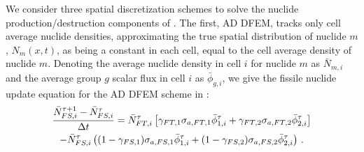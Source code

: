 We consider three spatial discretization schemes to solve the nuclide production/destruction components of .  
The first, AD DFEM, tracks only cell average nuclide densities, approximating the true spatial distribution of nuclide $m$, $N_m(x,t)$, as being a constant in each cell, equal to the cell average density of nuclide $m$.  
Denoting the average nuclide density in cell $i$ for nuclide $m$ as $\bar{N}_{m,i}$ and the average group $g$ scalar flux in cell $i$ as $\bar{\phi}_{g,i}$, we give the fissile nuclide update equation for the AD DFEM scheme in :
\begin{multline}
\frac{\bar{N}_{FS,i}^{\tau+1} - \bar{N}^{\tau}_{FS,i}}{\Delta t} = \bar{N}^{\tau}_{FT,i}\left[\gamma_{FT,1}\sigma_{a,FT,1} \bar{\phi}^{\tau}_{1,i} + \gamma_{FT,2}\sigma_{a,FT,2}\bar{\phi}^{\tau}_{2,i}  \right] \\
-\bar{N}^{\tau}_{FS,i}\left((1-\gamma_{FS,1})\sigma_{a,FS,1}\bar{\phi}^{\tau}_{1,i} + (1-\gamma_{FS,2})\sigma_{a,FS,2}\bar{\phi}^{\tau}_{2,i} \right) 
\, .
\label{eq:udfem_depletion}
\end{multline}
%
%
%
